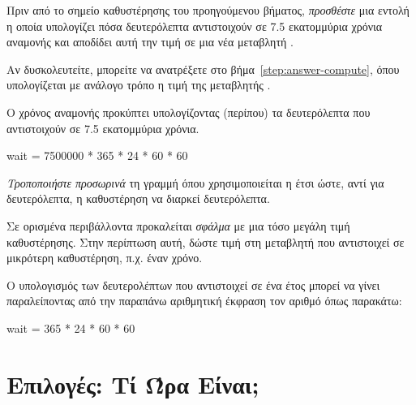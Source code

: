 \documentclass[a4paper,11pt,oneside]{book}
\begin{document}
\begin{step}
\label{step:wait-assign}
Πριν από το σημείο καθυστέρησης του προηγούμενου βήματος, \emph{προσθέστε} μια εντολή η οποία υπολογίζει πόσα δευτερόλεπτα αντιστοιχούν σε 7.5 εκατομμύρια χρόνια αναμονής και αποδίδει αυτή την τιμή σε μια νέα μεταβλητή .

Αν δυσκολευτείτε, μπορείτε να ανατρέξετε στο βήμα~\ref{step:answer-compute}, όπου υπολογίζεται με ανάλογο τρόπο η τιμή της μεταβλητής . 

\begin{answer}
Ο χρόνος αναμονής προκύπτει υπολογίζοντας (περίπου) τα δευτερόλεπτα που αντιστοιχούν σε 7.5 εκατομμύρια χρόνια. 

\begin{pynew}
wait = 7500000 * 365 * 24 * 60 * 60
\end{pynew}
\end{answer}
\end{step}

\begin{step}
\label{step:delay-75}
\emph{Τροποποιήστε προσωρινά} τη γραμμή όπου χρησιμοποιείται η  έτσι ώστε, αντί για  δευτερόλεπτα, η καθυστέρηση να διαρκεί  δευτερόλεπτα.

\marginnote[2pt]{\iconcaution}
\begin{note}
Σε ορισμένα περιβάλλοντα προκαλείται \emph{σφάλμα} με μια τόσο μεγάλη τιμή καθυστέρησης. Στην περίπτωση αυτή, δώστε τιμή στη μεταβλητή  που αντιστοιχεί σε μικρότερη καθυστέρηση, π.χ. έναν χρόνο.
\end{note}

\begin{answer}
Ο υπολογισμός των δευτερολέπτων που αντιστοιχεί σε ένα έτος μπορεί να γίνει παραλείποντας από την παραπάνω αριθμητική έκφραση τον αριθμό  όπως παρακάτω:

\begin{pynew}
wait = 365 * 24 * 60 * 60
\end{pynew}
\end{answer}
\end{step}

\section{Επιλογές: Τί Ώρα Είναι;}
\end{document}
